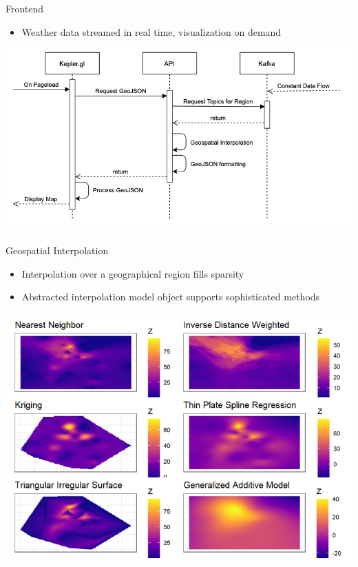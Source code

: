\documentclass{beamer}
\begin{document}
\begin{frame}{Frontend}
\begin{itemize}
    \item  Weather data streamed in real time, visualization on demand
\end{itemize}
\begin{center}
    \includegraphics[width=.9\linewidth]{figures/Frontend_Flow.png}
\end{center}
\end{frame}

\begin{frame}{Geospatial Interpolation}
\begin{itemize}
    \item Interpolation over a geographical region fills sparsity
    \item Abstracted interpolation model object supports sophisticated methods
\end{itemize}
\begin{center}
    \includegraphics[width=0.7\linewidth]{figures/geostats.png} \\
\end{center}
\end{frame}
\end{document}
